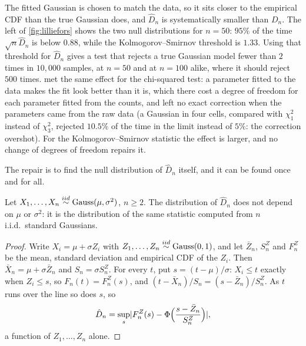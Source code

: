 \begin{pitfall}
The fitted Gaussian is chosen to match the data, so it sits closer to the empirical CDF than the true Gaussian does, and $\hat{D}_n$ is systematically smaller than $D_n$.
The left of \cref{fig:lilliefors} shows the two null distributions for $n = 50$: $95\%$ of the time $\sqrt{n}\hat{D}_n$ is below $0.88$, while the Kolmogorov--Smirnov threshold is $1.33$.
Using that threshold for $\hat{D}_n$ gives a test that rejects a true Gaussian model fewer than $2$ times in $10{,}000$ samples, at $n = 50$ and at $n = 100$ alike, where it should reject $500$ times.
 met the same effect for the chi-squared test: a parameter fitted to the data makes the fit look better than it is, which there cost a degree of freedom for each parameter fitted from the counts, and left no exact correction when the parameters came from the raw data (a Gaussian in four cells, compared with $\chi^2_1$ instead of $\chi^2_3$, rejected $10.5\%$ of the time in the limit instead of $5\%$: the correction overshot). For the Kolmogorov--Smirnov statistic the effect is larger, and no change of degrees of freedom repairs it.
\end{pitfall}

The repair is to find the null distribution of $\hat{D}_n$ itself, and it can be found once and for all.

\begin{proposition}
\label{prop:lilliefors}
Let $X_1, \ldots, X_n \stackrel{iid}{\sim} \text{Gauss}(\mu, \sigma^2)$, $n \geq 2$. The distribution of $\hat{D}_n$ does not depend on $\mu$ or $\sigma^2$: it is the distribution of the same statistic computed from $n$ i.i.d.\ standard Gaussians.
\end{proposition}

\begin{proof}
Write $X_i = \mu + \sigma Z_i$ with $Z_1, \ldots, Z_n \stackrel{iid}{\sim} \text{Gauss}(0, 1)$, and let $\bar{Z}_n$, $S^Z_n$ and $F^Z_n$ be the mean, standard deviation and empirical CDF of the $Z_i$.
Then $\bar{X}_n = \mu + \sigma\bar{Z}_n$ and $S_n = \sigma S^Z_n$.
For every $t$, put $s = (t - \mu)/\sigma$: $X_i \leq t$ exactly when $Z_i \leq s$, so $F_n(t) = F^Z_n(s)$, and $(t - \bar{X}_n)/S_n = (s - \bar{Z}_n)/S^Z_n$.
As $t$ runs over the line so does $s$, so
\[
\hat{D}_n = \sup_s\lvert F^Z_n(s) - \Phi\Big(\frac{s - \bar{Z}_n}{S^Z_n}\Big)\rvert,
\]
a function of $Z_1, \ldots, Z_n$ alone.
\end{proof}

